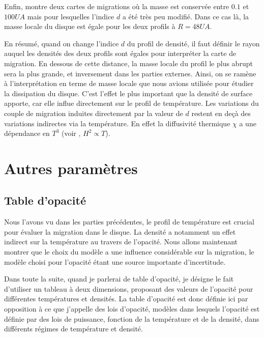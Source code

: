 Enfin,  montre deux cartes de migrations où la masse est conservée entre $0.1$ et $100\unit{UA}$ mais pour lesquelles l'indice $d$ a été très peu modifié. Dans ce cas là, la masse locale du disque est égale pour les deux profils à $R=48\unit{UA}$. 

\bigskip

En résumé, quand on change l'indice $d$ du profil de densité, il faut définir le rayon auquel les densités des deux profils sont égales pour interpréter la carte de migration. En dessous de cette distance, la masse locale du profil le plus abrupt sera la plus grande, et inversement dans les parties externes. Ainsi, on se ramène à l'interprétation en terme de masse locale que nous avions utilisée pour étudier la dissipation du disque. C'est l'effet le plus important que la densité de surface apporte, car elle influe directement sur le profil de température. Les variations du couple de migration induites directement par la valeur de $d$ restent en deçà des variations indirectes via la température. En effet la diffusivité thermique $\chi$ a une dépendance en $T^3$ (voir , $H^2\propto T$).

\section{Autres paramètres}



\subsection{Table d'opacité}\label{sec:influence_opacity_table}
Nous l'avons vu dans les parties précédentes, le profil de température est crucial pour évaluer la migration dans le disque. La densité a notamment un effet indirect sur la température au travers de l'opacité. Nous allons maintenant montrer que le choix du modèle a une influence considérable sur la migration, le modèle choisi pour l'opacité étant une source importante d'incertitude.

Dans toute la suite, quand je parlerai de table d'opacité, je désigne le fait d'utiliser un tableau à deux dimensions,
proposant des valeurs de l'opacité pour différentes températures et densités. La table d'opacité est donc définie ici par
opposition à ce que j'appelle des lois d'opacité, modèles dans lesquels l'opacité est définie par des lois de puissance,
fonction de la température et de la densité, dans différents régimes de température et densité.

